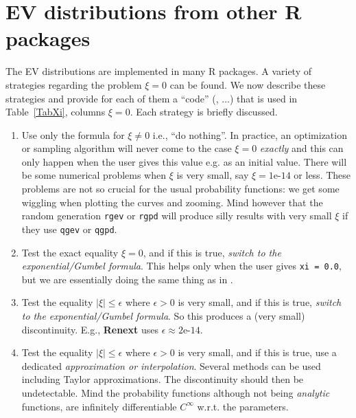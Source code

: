 \documentclass[11pt]{article}\usepackage[]{graphicx}\usepackage[]{xcolor}
\newcommand{\pkg}[1]{\textbf{#1}}
\newcommand{\code}[1]{\texttt{#1}}
\begin{document}
\section{EV distributions from other R packages}

The EV distributions are implemented in many R packages. A variety of
strategies regarding the problem $\xi = 0$ can be found. We now
describe these strategies and provide for each of them a ``code''
(, ...) that is used in Table~\ref{TabXi}, columns $\xi =
0$. Each strategy is briefly discussed.

\begin{enumerate}

\item {} Use only the formula for $\xi \neq 0$ i.e., {``do
    nothing''}.  In practice, an optimization or sampling algorithm
  will never come to the case $\xi = 0$ \textit{exactly} and this can
  only happen when the user gives this value e.g. as an initial value.
  There will be some numerical problems when $\xi$ is very small, say
  $\xi = \text{1e-14}$ or less. These problems are not so crucial for
  the usual probability functions: we get some wiggling when plotting
  the curves and zooming. Mind however that the random generation
  \code{rgev} or \code{rgpd} will produce silly results with very
  small $\xi$ if they use \code{qgev} or \code{qgpd}.
  
\item {} Test the exact equality $\xi = 0$, and if this is true,
  \textit{switch to the exponential/Gumbel formula}.  This helps only
  when the user gives \code{xi = 0.0}, but we are essentially doing
  the same thing as in .

\item  {}  Test the equality $ |\xi| \leqslant \epsilon$ where
  $\epsilon >0$ is very small, and if this is true, \textit{switch
    to the exponential/Gumbel formula}. So this produces a (very
  small) discontinuity.  E.g., \pkg{Renext} uses
  $\epsilon \approx \text{2e-14}$.
  
  
\item {} Test the equality
  $ |\xi| \leqslant \epsilon$ where $\epsilon >0$ is very small, and
  if this is true, use a dedicated \textit{approximation or
    interpolation}.  Several methods can be used including Taylor
  approximations. The discontinuity should then be undetectable.  Mind
  the probability functions although not being \textit{analytic}
  functions, are infinitely differentiable $C^\infty$ w.r.t. the
  parameters.
  
\end{enumerate}
\end{document}
